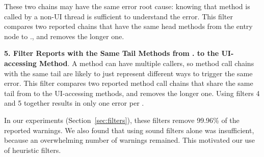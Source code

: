 \noindent
These two chains may have the same error root cause: knowing that
method  is called by a non-UI thread is sufficient to understand
the error.
This filter compares two reported chains that have the same
head methods from the entry node to .,
and removes the longer one.

\textbf{5. Filter Reports with the Same Tail Methods from .
to the UI-accessing Method}. A method
can have multiple callers, so method call chains with the same tail are likely
to just represent different ways to trigger the same error. This filter compares 
two reported method call chains that share the same 
tail from  to the UI-accessing methods, and
removes the longer one. Using filters 4 and 5 together results in
only one error per .



\vspace{1mm}

In our experiments (Section~\ref{sec:filters}), these filters remove
99.96\% of the reported warnings.
We also found that using sound filters alone was insufficient, because an overwhelming
number of warnings remained.  This motivated our use
of heuristic filters.




